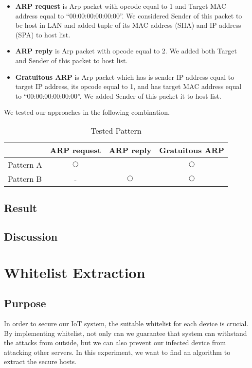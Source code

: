 \begin{itemize}
    \item \textbf{ARP request} is Arp packet with opcode equal to 1 and Target MAC address equal to “00:00:00:00:00:00”. We considered Sender of this packet to be host in LAN and added tuple of its MAC address (SHA) and IP address (SPA) to host list.
    \item \textbf{ARP reply} is Arp packet with opcode equal to 2. We added both Target and Sender of this packet to host list. 
    \item \textbf{Gratuitous ARP} is Arp packet which has is sender IP address equal to target IP address, its opcode equal to 1, and has target MAC address equal to “00:00:00:00:00:00”. We added Sender of this packet it to host list.  
\end{itemize}

We tested our approaches in the following combination.

\begin{table}[]
    \centering \begin{tabular}{l|ccc}
        &  ARP request  & ARP reply & Gratuitous ARP  \\ \hline
        Pattern A  &  $\bigcirc$ & - & $\bigcirc$  \\
        Pattern B  &  - & $\bigcirc$ & $\bigcirc$  
    \end{tabular}
    \caption{Tested Pattern}
    \label{table:s4_patterns}
\end{table}

\subsection{Result}
\subsection{Discussion}


\section{Whitelist Extraction}
\subsection{Purpose}
In order to secure our IoT system, the suitable whitelist for each device is crucial. By implementing whitelist, not only can we guarantee that system can withstand the attacks from outside, but we can also prevent our infected device from attacking other servers. In this experiment, we want to find an algorithm to extract the secure hosts. 

